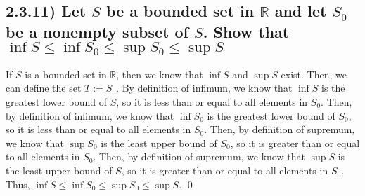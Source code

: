 \documentclass[11pt]{article}
\newcommand{\bbR}{\mathbb{R}}    %
\begin{document}
\subsection*{2.3.11) \quad Let $S$ be a bounded set in $\bbR$ and let $S_0$ be a nonempty subset of $S$. Show that $\inf{S} \leq \inf{S_0} \leq \sup{S_0} \leq \sup{S}$}
    If $S$ is a bounded set in $\bbR$, then we know that $\inf{S}$ and $\sup{S}$ exist. Then, we can define the set $T:=S_0$. By definition of infimum, we know that $\inf{S}$ is the greatest lower bound of $S$, so it is less than or equal to all elements in $S_0$. Then, by definition of infimum, we know that $\inf{S_0}$ is the greatest lower bound of $S_0$, so it is less than or equal to all elements in $S_0$. Then, by definition of supremum, we know that $\sup{S_0}$ is the least upper bound of $S_0$, so it is greater than or equal to all elements in $S_0$. Then, by definition of supremum, we know that $\sup{S}$ is the least upper bound of $S$, so it is greater than or equal to all elements in $S_0$. Thus, $\inf{S} \leq \inf{S_0} \leq \sup{S_0} \leq \sup{S}$. \qed
\end{document}

